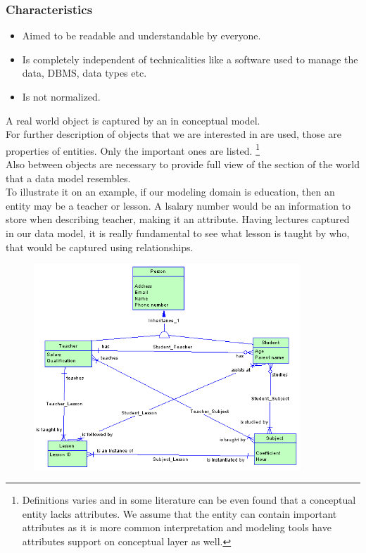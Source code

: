 \subsubsection{Characteristics}
\begin{itemize}
	\item Aimed to be readable and understandable by everyone.
	\item Is completely independent of technicalities like a software used to manage the data, DBMS, data types etc.
	\item Is not normalized.
\end{itemize}

A real world object is captured by an  in conceptual model. \\
For further description of objects that we are interested in  are used, those are properties of entities. Only the important ones are listed. \footnote{Definitions varies and in some literature can be even found that a conceptual entity lacks attributes. We assume that the entity can contain important attributes as it is more common interpretation and modeling tools have attributes support on conceptual layer as well.} \\
Also  between objects are necessary to provide full view of the section of the world that a data model resembles. \\

To illustrate it on an example, if our modeling domain is education, then an entity may be a teacher or lesson. 
A lsalary number would be an information to store when describing teacher, making it an attribute.
Having lectures captured in our data model, it is really fundamental to see what lesson is taught by who, that would be captured using relationships.

\begin{figure}[h]
	\centering
	\includegraphics[width=10cm]{../img/Conceptual_Model_PowerDesigner}
	\caption{\cite{ConceptualModelExample}}
\end{figure}

